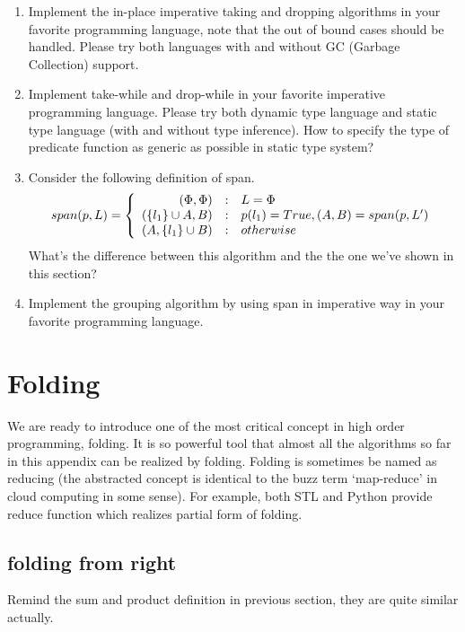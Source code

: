 \documentclass{article}
\begin{document}
\begin{Exercise}
\begin{enumerate}
\item Implement the in-place imperative taking and dropping algorithms in your favorite programming language, note that
the out of bound cases should be handled. Please try both languages with and without GC (Garbage Collection) support.
\item Implement take-while and drop-while in your favorite imperative programming language. Please try both dynamic
type language and static type language (with and without type inference). How to specify the type of predicate function
as generic as possible in static type system?
\item Consider the following definition of span.
\[
span(p, L) =  \left \{
  \begin{array}
  {r@{\quad:\quad}l}
  (\Phi, \Phi) & L = \Phi \\
  (\{ l_1 \} \cup A, B) & p(l_1) = True, (A, B) = span(p, L') \\
  (A, \{l_1\} \cup B) & otherwise
  \end{array}
\right.
\]
What's the difference between this algorithm and the the one we've shown in this section?
\item Implement the grouping algorithm by using span in imperative way in your favorite programming language.
\end{enumerate}
\end{Exercise}

\section{Folding}

We are ready to introduce one of the most critical concept in high order programming, folding. It is so powerful tool
that almost all the algorithms so far in this appendix can be realized by folding. Folding is sometimes be named as
reducing (the abstracted concept is identical to the buzz term `map-reduce' in cloud computing in some sense). For example,
both STL and Python provide reduce function which realizes partial form of folding.

\subsection{folding from right}
Remind the sum and product definition in previous section, they are quite similar actually.
\end{document}
